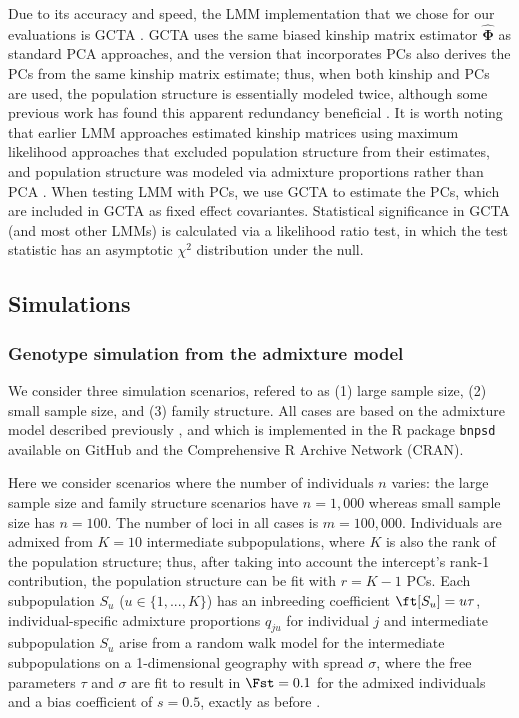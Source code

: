 \documentclass[11pt]{article}
\begin{document}
Due to its accuracy and speed, the LMM implementation that we chose for our evaluations is GCTA \citep{yang_gcta:_2011}.
GCTA uses the same biased kinship matrix estimator $\mathbf{\hat{\Phi}}$ as standard PCA approaches, and the version that incorporates PCs also derives the PCs from the same kinship matrix estimate; thus, when both kinship and PCs are used, the population structure is essentially modeled twice, although some previous work has found this apparent redundancy beneficial \citep{zhao_arabidopsis_2007, price_new_2010}.
It is worth noting that earlier LMM approaches estimated kinship matrices using maximum likelihood approaches that excluded population structure from their estimates, and population structure was modeled via admixture proportions rather than PCA \citep{yu_unified_2006, zhao_arabidopsis_2007}.
When testing LMM with PCs, we use GCTA to estimate the PCs, which are included in GCTA as fixed effect covariantes.
Statistical significance in GCTA (and most other LMMs) is calculated via a likelihood ratio test, in which the test statistic has an asymptotic $\chi^2$ distribution under the null.

\subsection{Simulations}

\subsubsection{Genotype simulation from the admixture model}

We consider three simulation scenarios, refered to as (1) large sample size, (2) small sample size, and (3) family structure.
All cases are based on the admixture model described previously \citep{ochoa_fst1, ochoa_fst2}, and which is implemented in the R package \texttt{bnpsd} available on GitHub and the Comprehensive R Archive Network (CRAN).

Here we consider scenarios where the number of individuals $n$ varies:
the large sample size and family structure scenarios have $n = 1,000$ whereas small sample size has $n = 100$.
The number of loci in all cases is $m = 100,000$.
Individuals are admixed from $K = 10$ intermediate subpopulations, where $K$ is also the rank of the population structure; thus, after taking into account the intercept's rank-1 contribution, the population structure can be fit with $r = K-1$ PCs.
Each subpopulation $S_u$ ($u \in \{ 1, ..., K \}$) has an inbreeding coefficient $\ft[S_u] = u \tau$, individual-specific admixture proportions $q_{ju}$ for individual $j$ and intermediate subpopulation $S_u$ arise from a random walk model for the intermediate subpopulations on a 1-dimensional geography with spread $\sigma$, where the free parameters $\tau$ and $\sigma$ are fit to result in $\Fst = 0.1$ for the admixed individuals and a bias coefficient of $s = 0.5$, exactly as before \citep{ochoa_fst2}.
\end{document}
